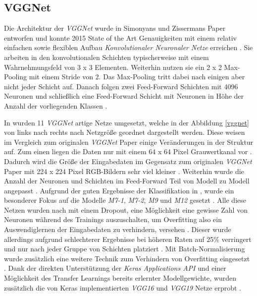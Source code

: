 \documentclass[twoside,a4paper]{IEEEtran}
\begin{document}
\subsection{VGGNet}  %
Die Architektur der \emph{VGGNet} wurde in Simonyans und Zissermans Paper \cite{simonyan2015deep} entworfen und konnte 2015 State of the Art Genauigkeiten mit einem relativ einfachen sowie flexiblen Aufbau \emph{Konvolutionaler Neuronaler Netze} erreichen \cite[S.1]{simonyan2015deep}. Sie arbeiten in den konvolutionalen Schichten typischerweise mit einem Wahrnehmungsfeld von 3 x 3 Elementen. Weiterhin nutzen sie ein 2 x 2 Max-Pooling mit einem Stride von 2. Das Max-Pooling tritt dabei nach einigen aber nicht jeder Schicht auf. Danach folgen zwei Feed-Forward Schichten mit 4096 Neuronen und schließlich eine Feed-Forward Schicht mit Neuronen in Höhe der Anzahl der vorliegenden Klassen \cite[S.2]{simonyan2015deep}.

In \cite{RHC} wurden 11 \emph{VGGNet} artige Netze umgesetzt, welche in der Abbildung \ref{vggnet} von links nach rechts nach Netzgröße geordnet dargestellt werden. Diese weisen im Vergleich zum originalen \emph{VGGNet} Paper einige Veränderungen in der Struktur auf. Zum einen liegen die Daten nur mit einem 64 x 64 Pixel Grauwertkanal vor \cite[S.3]{RHC}. Dadurch wird die Größe der Eingabedaten im Gegensatz zum originalen \emph{VGGNet} Paper mit 224 x 224 Pixel RGB-Bildern sehr viel kleiner \cite[S.2]{simonyan2015deep}. Weiterhin wurde die Anzahl der Neuronen und Schichten im Feed-Forward Teil von Modell zu Modell angepasst \cite[S.3]{RHC}. Aufgrund der guten Ergebnisse der Klassifikation in \cite{RHC}, wurde ein besonderer Fokus auf die Modelle \emph{M7-1}, \emph{M7-2}, \emph{M9} und \emph{M12} gesetzt \cite[S.5]{RHC}. Alle diese Netzen wurden nach \cite{RHC} mit einem Dropout, eine Möglichkeit eine gewisse Zahl von Neuronen während des Trainings auszuschalten, um Overfitting also ein Auswendiglernen der Eingabedaten zu verhindern, versehen \cite[S.306-307]{MACHINE_LEARNING}. Dieser wurde allerdings aufgrund schlechterer Ergebnisse bei höheren Raten auf 25\% verringert und nur nach jeder Gruppe von Schichten platziert \cite[S.2]{RHC}. Mit Batch-Normalisierung wurde zusätzlich eine weitere Technik zum Verhindern von Overfitting eingesetzt \cite[S.282-283]{MACHINE_LEARNING}. Dank der direkten Unterstützung der \emph{Keras Applications API} und einer Möglichkeit des Transfer Learnings bereits erlernter Modellgewichte, wurden zusätzlich die von Keras implementierten \emph{VGG16} und \emph{VGG19} Netze erprobt \cite{vgg_keras}.
\end{document}
